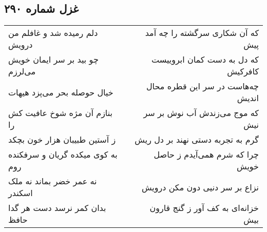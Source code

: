 \begin{center}
\section*{غزل شماره ۲۹۰}
\label{sec:sh290}
\begin{longtable}{l p{0.5cm} r}
دلم رمیده شد و غافلم من درویش
&&
که آن شکاری سرگشته را چه آمد پیش
\\
چو بید بر سر ایمان خویش می‌لرزم
&&
که دل به دست کمان ابروییست کافرکیش
\\
خیال حوصله بحر می‌پزد هیهات
&&
چه‌هاست در سر این قطره محال اندیش
\\
بنازم آن مژه شوخ عافیت کش را
&&
که موج می‌زندش آب نوش بر سر نیش
\\
ز آستین طبیبان هزار خون بچکد
&&
گرم به تجربه دستی نهند بر دل ریش
\\
به کوی میکده گریان و سرفکنده روم
&&
چرا که شرم همی‌آیدم ز حاصل خویش
\\
نه عمر خضر بماند نه ملک اسکندر
&&
نزاع بر سر دنیی دون مکن درویش
\\
بدان کمر نرسد دست هر گدا حافظ
&&
خزانه‌ای به کف آور ز گنج قارون بیش
\\
\end{longtable}
\end{center}

